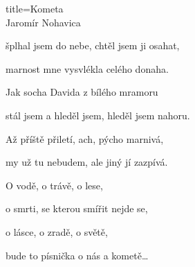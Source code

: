 \begin{song}{title=\centering Kometa \\\normalsize Jaromír Nohavica \vspace*{-0.3cm}}
{\begin{minipage}[t]{0.48\textwidth}
	šplhal jsem do nebe, chtěl jsem ji osahat,
	
	marnost mne vysvlékla celého donaha.
	
\end{minipage}\begin{minipage}[t]{0.5\textwidth}\setlength{\parindent}{0.45cm}\vspace*{0.55cm}  %

\sloka
	Jak socha Davida z bílého mramoru
	
	stál jsem a hleděl jsem, hleděl jsem nahoru.
	
	Až příště přiletí, ach, pýcho marnivá,
	
	my už tu nebudem, ale jiný jí zazpívá.


	O vodě, o trávě, o lese,
	
	o smrti, se kterou smířit nejde se,
	
	o lásce, o zradě, o světě,
	
	bude to písnička o nás a kometě\dots

\end{minipage}
}
\setcounter{Slokočet}{0}
\end{song}


